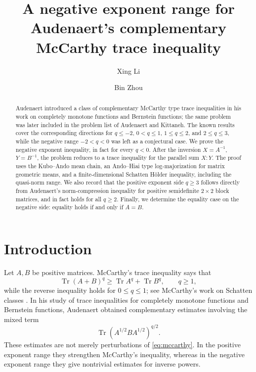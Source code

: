 \documentclass[11pt]{amsart}
\title[A negative exponent range for a complementary McCarthy inequality]
{A negative exponent range for Audenaert's complementary McCarthy trace inequality}
\author{Xing Li}
\author{Bin Zhou}
\numberwithin{equation}{section}
\newcommand{\Tr}{\operatorname{Tr}}
\begin{document}
\begin{abstract}
Audenaert introduced a class of complementary McCarthy type trace inequalities in his work on completely monotone functions and Bernstein functions; the same problem was later included in the problem list of Audenaert and Kittaneh.  The known results cover the corresponding directions for \(q\le -2\), \(0<q\le 1\), \(1\le q\le 2\), and \(2\le q\le 3\), while the negative range \(-2<q<0\) was left as a conjectural case.  We prove the negative exponent inequality, in fact for every \(q<0\).  After the inversion \(X=A^{-1}\), \(Y=B^{-1}\), the problem reduces to a trace inequality for the parallel sum \(X:Y\).  The proof uses the Kubo--Ando mean chain, an Ando--Hiai type log-majorization for matrix geometric means, and a finite-dimensional Schatten H\"older inequality, including the quasi-norm range.  We also record that the positive exponent side \(q\ge 3\) follows directly from Audenaert's norm-compression inequality for positive semidefinite \(2\times2\) block matrices, and in fact holds for all \(q\ge 2\).  Finally, we determine the equality case on the negative side: equality holds if and only if \(A=B\).
\end{abstract}

\maketitle

\section{Introduction}

Let \(A,B\) be positive matrices.  McCarthy's trace inequality says that
\begin{equation}\label{eq:mccarthy}
    \Tr(A+B)^q\ge \Tr A^q+\Tr B^q,\qquad q\ge 1,
\end{equation}
while the reverse inequality holds for \(0\le q\le 1\); see McCarthy's work on Schatten classes \cite{McCarthy1967}.  In his study of trace inequalities for completely monotone functions and Bernstein functions, Audenaert obtained complementary estimates involving the mixed term
\[
    \Tr(A^{1/2}BA^{1/2})^{q/2}.
\]
These estimates are not merely perturbations of \eqref{eq:mccarthy}.  In the positive exponent range they strengthen McCarthy's inequality, whereas in the negative exponent range they give nontrivial estimates for inverse powers.
\end{document}
